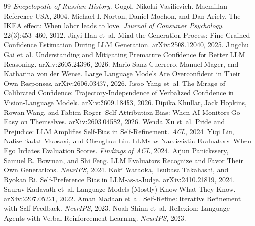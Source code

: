 \begin{thebibliography}{99}
 \emph{Encyclopedia of Russian History}. Gogol, Nikolai Vasilievich. Macmillan Reference USA, 2004.
 Michael I. Norton, Daniel Mochon, and Dan Ariely. The IKEA effect: When labor leads to love. \emph{Journal of Consumer Psychology}, 22(3):453--460, 2012.
 Jinyi Han et~al. Mind the Generation Process: Fine-Grained Confidence Estimation During LLM Generation. arXiv:2508.12040, 2025.
 Jingchu Gai et~al. Understanding and Mitigating Premature Confidence for Better LLM Reasoning. arXiv:2605.24396, 2026.
 Mario Sanz-Guerrero, Manuel Mager, and Katharina von der Wense. Large Language Models Are Overconfident in Their Own Responses. arXiv:2606.03437, 2026.
 Jisoo Yang et~al. The Mirage of Calibrated Confidence: Trajectory-Independence of Verbalized Confidence in Vision-Language Models. arXiv:2609.18453, 2026.
 Dipika Khullar, Jack Hopkins, Rowan Wang, and Fabien Roger. Self-Attribution Bias: When AI Monitors Go Easy on Themselves. arXiv:2603.04582, 2026.
 Wenda Xu et~al. Pride and Prejudice: LLM Amplifies Self-Bias in Self-Refinement. \emph{ACL}, 2024.
 Yiqi Liu, Nafise Sadat Moosavi, and Chenghua Lin. LLMs as Narcissistic Evaluators: When Ego Inflates Evaluation Scores. \emph{Findings of ACL}, 2024.
 Arjun Panickssery, Samuel R. Bowman, and Shi Feng. LLM Evaluators Recognize and Favor Their Own Generations. \emph{NeurIPS}, 2024.
 Koki Wataoka, Tsubasa Takahashi, and Ryokan Ri. Self-Preference Bias in LLM-as-a-Judge. arXiv:2410.21819, 2024.
 Saurav Kadavath et~al. Language Models (Mostly) Know What They Know. arXiv:2207.05221, 2022.
 Aman Madaan et~al. Self-Refine: Iterative Refinement with Self-Feedback. \emph{NeurIPS}, 2023.
 Noah Shinn et~al. Reflexion: Language Agents with Verbal Reinforcement Learning. \emph{NeurIPS}, 2023.

\end{thebibliography}
